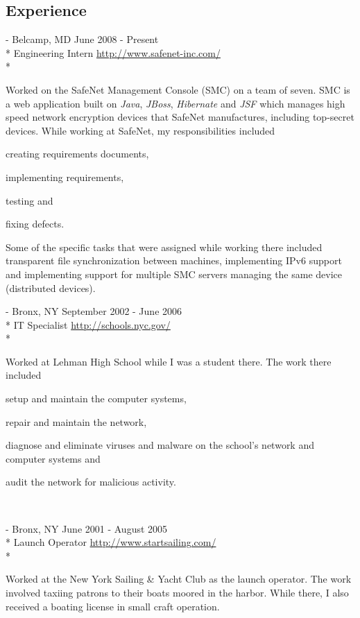 \documentclass[a4paper,margin,line]{resume}
\newcommand{\rurl}[1]{\hfill {\footnotesize \url{#1}}}
\newcommand{\rdate}[1]{\hfill {\small #1}}
\renewcommand{\employer}[5]{\item[#1] - #2 \rdate{#3} \\* #4 \rurl{#5} \\*}
\begin{document}
\begin{resume}
\section{\mysidestyle Experience}
	\begin{asparadesc}
		\employer{SafeNet Inc}{Belcamp, MD}{June 2008 - Present}{Engineering
		Intern}{http://www.safenet-inc.com/}

		\small
		Worked on the SafeNet Management Console (SMC) on a team of seven. SMC is
		a web application built on \emph{Java}, \emph{JBoss}, \emph{Hibernate} and
		\emph{JSF} which manages high speed network encryption devices that SafeNet
		manufactures, including top-secret devices. While working at SafeNet, my
		responsibilities included \begin{inparaenum} \item creating requirements
		documents, \item implementing requirements, \item testing and \item fixing
		defects. \end{inparaenum} Some of the specific tasks that were assigned
		while working there included transparent file synchronization between
		machines, implementing IPv6 support and implementing support for multiple
		SMC servers managing the same device (distributed devices).
		\normalsize
		\\
		\employer{New York City Department of Education}{Bronx, NY}{September 2002 -
		June 2006}{IT Specialist}{http://schools.nyc.gov/}

		\small
		Worked at Lehman High School while I was a student there. The work there
		included \begin{inparaenum} \item setup and maintain the computer systems,
		\item repair and maintain the network, \item diagnose and eliminate viruses
		and malware on the school's network and computer systems and \item audit the
		network for malicious activity. \end{inparaenum}
		\normalsize
		\\
		\employer{New York Sailing \& Yacht Club}{Bronx, NY}{June 2001 - August 2005}{Launch
		Operator}{http://www.startsailing.com/}
		
		\small
		Worked at the New York Sailing \& Yacht Club as the launch operator. The
		work involved taxiing patrons to their boats moored in the harbor. While
		there, I also received a boating license in small craft operation.
		\normalsize
	\end{asparadesc}


\end{resume}
\end{document}
